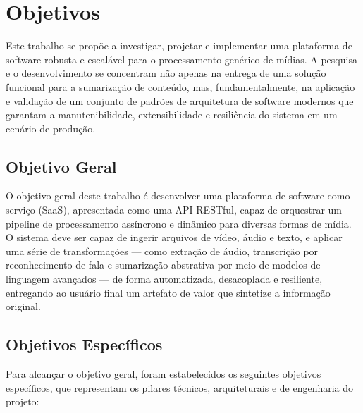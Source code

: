 \section{Objetivos}
\label{sec:objetivos}

Este trabalho se propõe a investigar, projetar e implementar uma plataforma de software robusta e escalável para o processamento genérico de mídias. A pesquisa e o desenvolvimento se concentram não apenas na entrega de uma solução funcional para a sumarização de conteúdo, mas, fundamentalmente, na aplicação e validação de um conjunto de padrões de arquitetura de software modernos que garantam a manutenibilidade, extensibilidade e resiliência do sistema em um cenário de produção.

\subsection{Objetivo Geral}

O objetivo geral deste trabalho é desenvolver uma plataforma de software como serviço (SaaS), apresentada como uma API RESTful, capaz de orquestrar um pipeline de processamento assíncrono e dinâmico para diversas formas de mídia. O sistema deve ser capaz de ingerir arquivos de vídeo, áudio e texto, e aplicar uma série de transformações — como extração de áudio, transcrição por reconhecimento de fala e sumarização abstrativa por meio de modelos de linguagem avançados — de forma automatizada, desacoplada e resiliente, entregando ao usuário final um artefato de valor que sintetize a informação original.

\subsection{Objetivos Específicos}

Para alcançar o objetivo geral, foram estabelecidos os seguintes objetivos específicos, que representam os pilares técnicos, arquiteturais e de engenharia do projeto:

